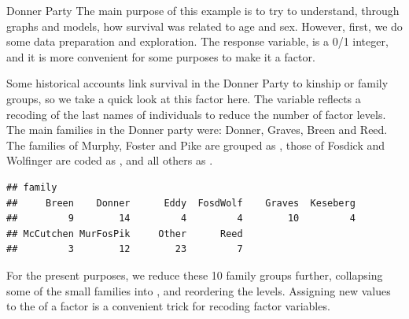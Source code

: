 \documentclass[11pt]{book}
\renewenvironment{knitrout}{\small\renewcommand{\baselinestretch}{.85}}{} %
\begin{document}
\begin{Example}[donner1]{Donner Party}
The main purpose of this example is to try to understand, through graphs and models, how survival
was related to age and sex. However, first, we do some data preparation and exploration.
The response variable,  is a 0/1 integer, and it is more convenient for some purposes to
make it a factor.
\begin{knitrout}
\color{fgcolor}\begin{kframe}
\begin{alltt}
\hlopt{$} \hlkwb{<-} \hlopt{$} \hlstd{=}\hlstd{(}\hlstd{,} \hlstd{))}
\end{alltt}
\end{kframe}
\end{knitrout}

Some historical accounts \citep{Grayson:1990} link survival in the Donner Party to
kinship or family groups, so we take a quick look at this factor here.
The variable 
reflects a recoding of the last names of individuals to reduce the number of factor levels. 
The main families in the Donner party were: Donner, Graves, Breen and Reed. 
The families of Murphy, Foster and Pike are grouped as , 
those of Fosdick and Wolfinger are coded as , and all others as 
. 

\begin{knitrout}
\color{fgcolor}\begin{kframe}
\begin{alltt}
\hlstd{(}\hlopt{~} 
\end{alltt}
\begin{verbatim}
## family
##     Breen    Donner      Eddy  FosdWolf    Graves  Keseberg 
##         9        14         4         4        10         4 
## McCutchen MurFosPik     Other      Reed 
##         3        12        23         7
\end{verbatim}
\end{kframe}
\end{knitrout}
For the present purposes, we reduce these 10 family groups further, collapsing some of
the small families into , 
and reordering the levels.  Assigning new values to the  of a factor
is a convenient trick for recoding factor variables.
\begin{knitrout}
\color{fgcolor}\begin{kframe}
\begin{alltt}
 \hlkwb{<-} \hlopt{$}
\hlstd{(fam)[}\hlstd{(}\hlstd{,}\hlstd{,}\hlstd{,}\hlstd{,}\hlstd{)]} \hlkwb{<-} 


\end{alltt}
\end{kframe}
\end{knitrout}
\end{Example}
\end{document}
